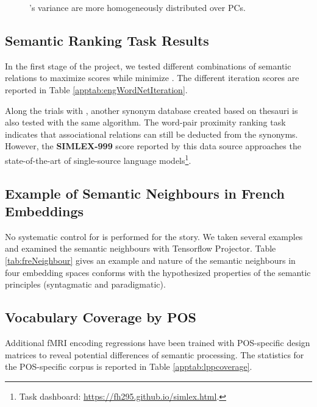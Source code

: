 \begin{figure}
\begin{minipage}[t]{.5\textwidth}
{        }
        \caption[French  Space Visualization]{'s variance are more homogeneously distributed over PCs.}
        \label{fig:freASNmarcher}
    \end{minipage}
\end{figure}

\subsection{Semantic Ranking Task Results}
\label{appsubsec:wnembeddingtests}

In the first stage of the project, we tested different combinations of semantic relations to maximize \similarity scores while minimize \association. The different iteration scores are reported in Table \ref{apptab:engWordNetIteration}. 

Along the trials with , another synonym database created based on thesauri is also tested with the same algorithm. The word-pair proximity ranking task indicates that associational relations can still be deducted from the synonyms. However, the \textbf{SIMLEX-999} score reported by this data source approaches the state-of-the-art of single-source language models\footnote{Task dashboard: \url{https://fh295.github.io/simlex.html}.}. 



\subsection{Example of Semantic Neighbours in French Embeddings} 

No systematic control for  is performed for the  story. We taken several examples and examined the semantic neighbours with Tensorflow Projector. Table \ref{tab:freNeighbour} gives an example and nature of the semantic neighbours in four embedding spaces conforms with the hypothesized properties of the semantic principles (syntagmatic and paradigmatic).




\subsection{Vocabulary Coverage by POS}

Additional fMRI encoding regressions have been trained with POS-specific design matrices to reveal potential differences of semantic processing. The statistics for the POS-specific corpus is reported in Table \ref{apptab:lppcoverage}.



